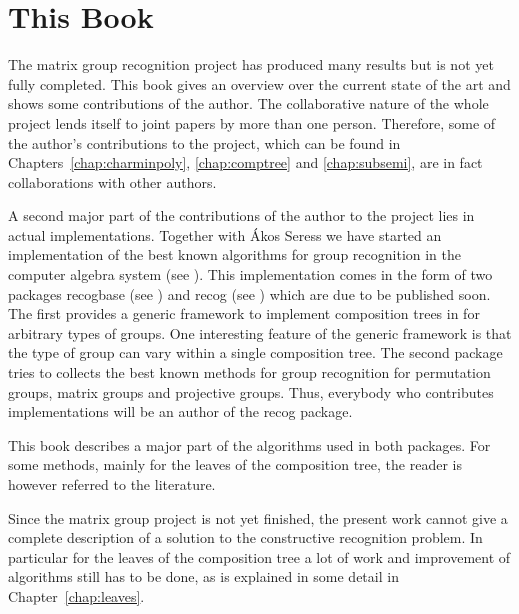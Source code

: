\section{This Book}

The matrix group recognition project has produced many
results but is not yet fully completed.
This book gives an overview over the current state of the art and
shows some contributions of the author. The collaborative nature of the
whole project lends itself to joint papers by more than one person.
Therefore, some of the author's contributions to the project, which can
be found in Chapters~\ref{chap:charminpoly}, \ref{chap:comptree} and
\ref{chap:subsemi}, are in fact collaborations with other authors.

A second major part of the contributions of the author to the project lies
in actual implementations. Together with \'Akos Seress we have started an
implementation of the best known algorithms for group recognition in the
{\GAP} computer algebra system (see \cite{GAP4}). This implementation comes
in the form of two {\GAP} packages \textsf{recogbase} (see
%
%
\cite{recogbase}) and \textsf{recog} (see \cite{recog})
which are due to be published soon. The first provides a generic framework
to implement composition trees in {\GAP} for arbitrary types of groups. 
%
One interesting feature of the generic framework is that the type of group
can vary within a single composition tree. The
second package tries to collects the best known methods for group
recognition for permutation groups, matrix groups and projective groups.
Thus, everybody who contributes implementations will be an author of the
\textsf{recog} package. 

This book describes a major part of the algorithms used in both
packages. For some methods, mainly for the leaves of the composition tree,
the reader is however referred to the literature.
%

Since the matrix group project is not yet finished, the present work
cannot give a complete description of a solution to the constructive
recognition problem. In particular for the leaves of the composition tree
a lot of work and improvement of algorithms still has to be done, as is
explained in some detail in Chapter~\ref{chap:leaves}.
%


